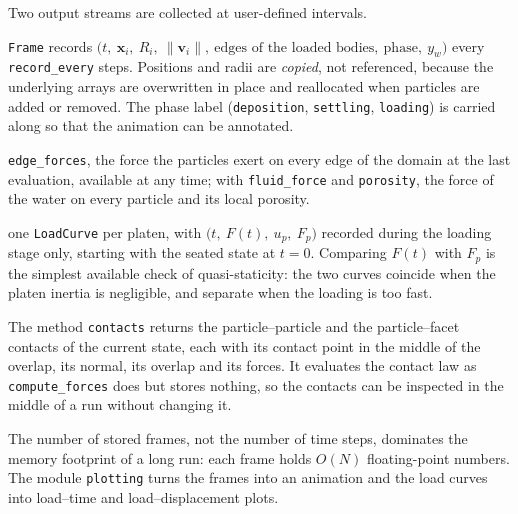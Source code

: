 Two output streams are collected at user-defined intervals.

\begin{description}[leftmargin=1.6em,style=nextline]
  \item[Frames] \texttt{Frame} records
        $\bigl(t,\ \mathbf{x}_{i},\ R_{i},\ \lVert\mathbf{v}_{i}\rVert,\
        \text{edges of the loaded bodies},\ \text{phase},\ y_{w}\bigr)$ every
        \texttt{record\_every} steps.  Positions and radii are \emph{copied},
        not referenced, because the underlying arrays are overwritten in place
        and reallocated when particles are added or removed.  The phase label
        (\texttt{deposition}, \texttt{settling}, \texttt{loading}) is carried
        along so that the animation can be annotated.
  \item[Edge forces] \texttt{edge\_forces}, the force the particles exert on every
        edge of the domain at the last evaluation, available at any time; with
        \texttt{fluid\_force} and \texttt{porosity}, the force of the water on
        every particle and its local porosity.
  \item[Load curves] one \texttt{LoadCurve} per platen, with
        $\bigl(t,\ F(t),\ u_{p},\ F_{p}\bigr)$ recorded during the loading stage
        only, starting with the seated state at $t=0$.  Comparing $F(t)$ with
        $F_{p}$ is the simplest available check of quasi-staticity: the two
        curves coincide when the platen inertia is negligible, and separate when
        the loading is too fast.
  \item[Contacts] The method \texttt{contacts} returns the particle--particle and the particle--facet contacts of the current state, each with its contact point in the middle of the overlap, its normal, its overlap and its forces.
        It evaluates the contact law as \texttt{compute\_forces} does but stores nothing, so the contacts can be inspected in the middle of a run without changing it.
\end{description}

The number of stored frames, not the number of time steps, dominates the memory
footprint of a long run: each frame holds $O(N)$ floating-point numbers.  The
module \texttt{plotting} turns the frames into an animation and the load curves
into load--time and load--displacement plots.

